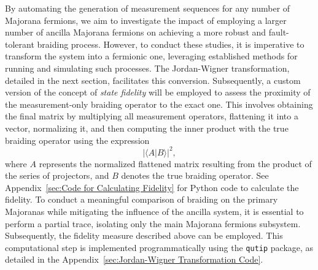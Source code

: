 \documentclass{article}
\begin{document}
\vspace{12pt}
By automating the generation of measurement sequences for any number of Majorana fermions, we aim to investigate the impact of employing a larger number of ancilla Majorana fermions on achieving a more robust and fault-tolerant braiding process. However, to conduct these studies, it is imperative to transform the system into a fermionic one, leveraging established methods for running and simulating such processes. The Jordan-Wigner transformation, detailed in the next section, facilitates this conversion. Subsequently, a custom version of the concept of \textit{state fidelity} will be employed to assess the proximity of the measurement-only braiding operator to the exact one. This involves obtaining the final matrix by multiplying all measurement operators, flattening it into a vector, normalizing it, and then computing the inner product with the true braiding operator using the expression
\[
	|\langle A | B \rangle|^2 ,
\]
where \(A\) represents the normalized flattened matrix resulting from the product of the series of projectors, and \(B\) denotes the true braiding operator. See Appendix~\ref{sec:Code for Calculating Fidelity} for Python code to calculate the fidelity. To conduct a meaningful comparison of braiding on the primary Majoranas while mitigating the influence of the ancilla system, it is essential to perform a partial trace, isolating only the main Majorana fermions subsystem. Subsequently, the fidelity measure described above can be employed. This computational step is implemented programmatically using the \texttt{qutip} package, as detailed in the Appendix~\ref{sec:Jordan-Wigner Transformation Code}.
\end{document}
